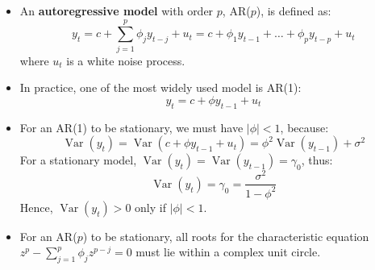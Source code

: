 \documentclass[notitlepage]{article}
\DeclareMathOperator{\Var}{Var}
\begin{document}
\begin{itemize}
    \item An \textbf{autoregressive model} with order \(p\), AR(\(p\)), is defined as:
    \[
    y_t = c + \sum_{j=1}^p \phi_j y_{t-j} + u_t = c + \phi_1 y_{t-1} + \dots + \phi_p y_{t-p}  + u_t
    \]
    where \(u_t\) is a white noise process.
    \item In practice, one of the most widely used model is AR(1):
    \[
    y_t = c + \phi y_{t-1} + u_t
    \]
    \item For an AR(1) to be stationary, we must have \(|\phi| < 1\), because:
    \[
    \Var(y_t) = \Var(c + \phi y_{t-1} + u_t) = \phi^2\Var(y_{t-1}) + \sigma^2
    \]
    For a stationary model, \(\Var(y_t) = \Var(y_{t-1}) = \gamma_0\), thus:
    \[
    \Var(y_t) = \gamma_0 = \frac{\sigma^2}{1-\phi^2}
    \]
    Hence, \(\Var(y_t) > 0\) only if \(|\phi| < 1\).
    \item For an AR(\(p\)) to be stationary, all roots for the characteristic equation \(z^p - \sum_{j=1}^p \phi_j z^{p-j}=0\) must lie within a complex unit circle.
    

\end{itemize}
\end{document}
